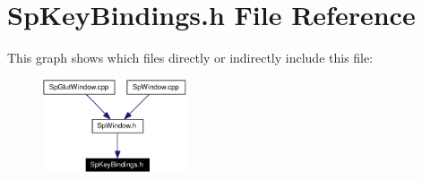 \section{Sp\-Key\-Bindings.h File Reference}
\label{SpKeyBindings_8h}


This graph shows which files directly or indirectly include this file:\begin{figure}[H]
\begin{center}
\leavevmode
\includegraphics[width=120pt]{SpKeyBindings_8h__dep__incl}
\end{center}
\end{figure}
